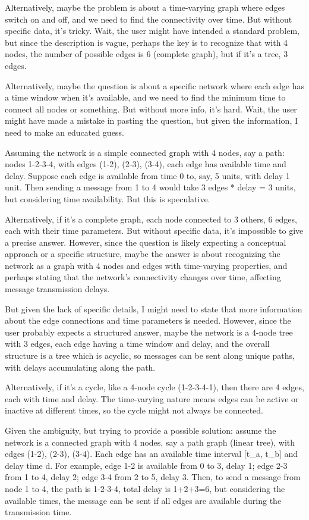 Alternatively, maybe the problem is about a time-varying graph where edges switch on and off, and we need to find the connectivity over time. But without specific data, it's tricky. Wait, the user might have intended a standard problem, but since the description is vague, perhaps the key is to recognize that with 4 nodes, the number of possible edges is 6 (complete graph), but if it's a tree, 3 edges. 

Alternatively, maybe the question is about a specific network where each edge has a time window when it's available, and we need to find the minimum time to connect all nodes or something. But without more info, it's hard. Wait, the user might have made a mistake in pasting the question, but given the information, I need to make an educated guess. 

Assuming the network is a simple connected graph with 4 nodes, say a path: nodes 1-2-3-4, with edges (1-2), (2-3), (3-4), each edge has available time and delay. Suppose each edge is available from time 0 to, say, 5 units, with delay 1 unit. Then sending a message from 1 to 4 would take 3 edges * delay = 3 units, but considering time availability. But this is speculative. 

Alternatively, if it's a complete graph, each node connected to 3 others, 6 edges, each with their time parameters. But without specific data, it's impossible to give a precise answer. However, since the question is likely expecting a conceptual approach or a specific structure, maybe the answer is about recognizing the network as a graph with 4 nodes and edges with time-varying properties, and perhaps stating that the network's connectivity changes over time, affecting message transmission delays. 

But given the lack of specific details, I might need to state that more information about the edge connections and time parameters is needed. However, since the user probably expects a structured answer, maybe the network is a 4-node tree with 3 edges, each edge having a time window and delay, and the overall structure is a tree which is acyclic, so messages can be sent along unique paths, with delays accumulating along the path. 

Alternatively, if it's a cycle, like a 4-node cycle (1-2-3-4-1), then there are 4 edges, each with time and delay. The time-varying nature means edges can be active or inactive at different times, so the cycle might not always be connected. 

Given the ambiguity, but trying to provide a possible solution: assume the network is a connected graph with 4 nodes, say a path graph (linear tree), with edges (1-2), (2-3), (3-4). Each edge has an available time interval [t_a, t_b] and delay time d. For example, edge 1-2 is available from 0 to 3, delay 1; edge 2-3 from 1 to 4, delay 2; edge 3-4 from 2 to 5, delay 3. Then, to send a message from node 1 to 4, the path is 1-2-3-4, total delay is 1+2+3=6, but considering the available times, the message can be sent if all edges are available during the transmission time. 

